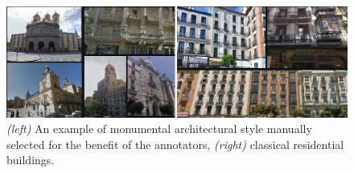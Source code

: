 \begin{figure}[t] %
     \centering
     \includegraphics[width=12cm]{imgs/old-.jpg} 
     \caption{\emph{(left)} An example of monumental architectural style manually selected for the benefit of the annotators, \emph{(right)} classical residential buildings.}
     \label{fig:monumental_classical}
\end{figure}
